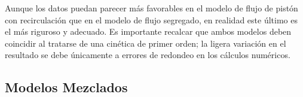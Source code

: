 \begin{center}
\end{center}
\noindent Aunque los datos puedan parecer más favorables en el modelo de flujo de pistón con recirculación que en el modelo de flujo segregado, en realidad este último es el más riguroso y adecuado. Es importante recalcar que ambos modelos deben coincidir al tratarse de una cinética de primer orden; la ligera variación en el resultado se debe únicamente a errores de redondeo en los cálculos numéricos.

\newpage
\subsection{Modelos Mezclados}


